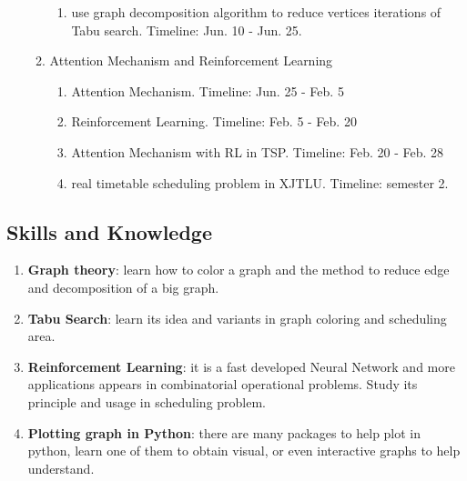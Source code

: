 \documentclass{article}
\begin{document}
\begin{itemize}
\begin{enumerate}
\begin{enumerate}
						\item use graph decomposition algorithm to reduce vertices iterations of Tabu search. Timeline: Jun. 10 - Jun. 25.
		            \end{enumerate}
		      \item Attention Mechanism and Reinforcement Learning
		            \begin{enumerate}
			            \item Attention Mechanism. Timeline: Jun. 25 - Feb. 5
			            \item Reinforcement Learning. Timeline: Feb. 5 - Feb. 20
			            \item Attention Mechanism with RL in TSP. Timeline: Feb. 20 - Feb. 28
			            \item real timetable scheduling problem in XJTLU. Timeline: semester 2.
		            \end{enumerate}
	      \end{enumerate}
\end{itemize}

\subsection{Skills and Knowledge}
\begin{enumerate}
	\item \textbf{Graph theory}: learn how to color a graph and the method to reduce edge and decomposition of a big graph.
	\item \textbf{Tabu Search}: learn its idea and variants in graph coloring and scheduling area.
	\item \textbf{Reinforcement Learning}: it is a fast developed Neural Network and more applications appears in combinatorial operational problems. Study its principle and usage in scheduling problem.
	\item \textbf{Plotting graph in Python}: there are many packages to help plot in python, learn one of them to obtain visual, or even interactive graphs to help understand.
\end{enumerate}
\end{document}
